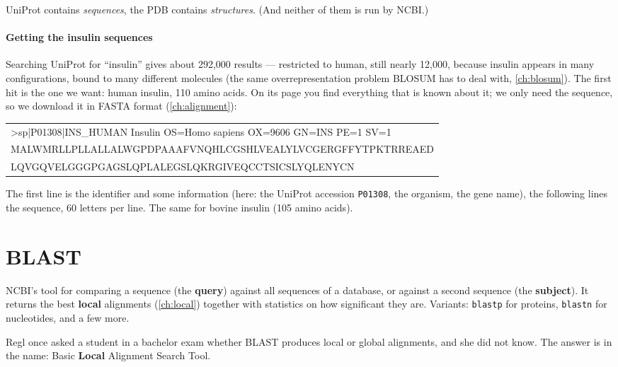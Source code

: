 \documentclass[11pt, oneside]{book}
\makeatletter
\newcommand{\alnblock}[1]{%
  \par\smallskip
  {\centering\ttfamily\small
   \begin{tabular}{@{}l@{}}#1\end{tabular}\par}%
  \smallskip}
\let\originalsection\section
\renewcommand{\section}{\Needspace{7\baselineskip}\originalsection}
\makeatother
\begin{document}
\begin{notebox}[title={Don't mix them up}]
UniProt contains \emph{sequences}, the PDB contains \emph{structures}. (And
neither of them is run by NCBI.)
\end{notebox}

\paragraph{Getting the insulin sequences}
Searching UniProt for ``insulin'' gives about 292,000 results --- restricted to
human, still nearly 12,000, because insulin appears in many configurations,
bound to many different molecules (the same overrepresentation problem BLOSUM
has to deal with, \cref{ch:blosum}). The first hit is the one we want: human
insulin, 110 amino acids. On its page you find everything that is known about
it; we only need the sequence, so we download it in FASTA format
(\cref{ch:alignment}):

\alnblock{%
>sp|P01308|INS\_HUMAN Insulin OS=Homo sapiens OX=9606 GN=INS PE=1 SV=1\\
MALWMRLLPLLALLALWGPDPAAAFVNQHLCGSHLVEALYLVCGERGFFYTPKTRREAED\\
LQVGQVELGGGPGAGSLQPLALEGSLQKRGIVEQCCTSICSLYQLENYCN}

The first line is the identifier and some information (here: the UniProt
accession \texttt{P01308}, the organism, the gene name), the following lines
the sequence, 60 letters per line. The same for bovine insulin (105 amino acids).

\section{BLAST}
\label{sec:blast}

\begin{defbox}[title={BLAST = Basic Local Alignment Search Tool}]
NCBI's tool for comparing a sequence (the \textbf{query}) against all
sequences of a database, or against a second sequence (the \textbf{subject}).
It returns the best \textbf{local} alignments (\cref{ch:local}) together with
statistics on how significant they are. Variants: \texttt{blastp} for proteins,
\texttt{blastn} for nucleotides, and a few more.
\end{defbox}

\begin{notebox}[title={Exam classic}]
Regl once asked a student in a bachelor exam whether BLAST produces local or
global alignments, and she did not know. The answer is in the name: Basic
\textbf{Local} Alignment Search Tool.
\end{notebox}
\end{document}
